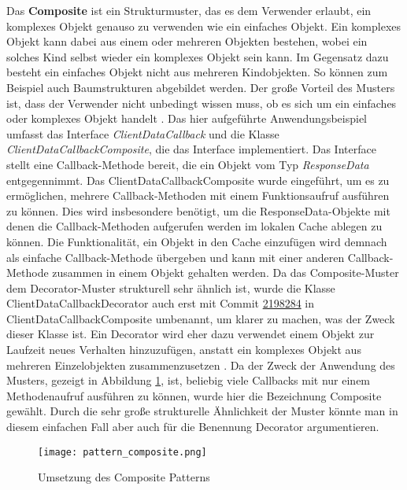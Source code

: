 Das \textbf{Composite} ist ein Strukturmuster, das es dem Verwender erlaubt, ein komplexes Objekt genauso zu verwenden wie ein einfaches Objekt.
Ein komplexes Objekt kann dabei aus einem oder mehreren Objekten bestehen, wobei ein solches Kind selbst wieder ein komplexes Objekt sein kann.
Im Gegensatz dazu besteht ein einfaches Objekt nicht aus mehreren Kindobjekten.
So können zum Beispiel auch Baumstrukturen abgebildet werden.
Der große Vorteil des Musters ist, dass der Verwender nicht unbedingt wissen muss, ob es sich um ein einfaches oder komplexes Objekt handelt
\cite[pp.~142--155]{geirhos2015entwurfsmuster}.
\newline
Das hier aufgeführte Anwendungsbeispiel umfasst das Interface \textit{ClientDataCallback} und die Klasse \textit{ClientDataCallbackComposite}, die das Interface implementiert.
Das Interface stellt eine Callback-Methode bereit, die ein Objekt vom Typ \textit{ResponseData} entgegennimmt.
Das ClientDataCallbackComposite wurde eingeführt, um es zu ermöglichen, mehrere Callback-Methoden mit einem Funktionsaufruf ausführen zu können.
Dies wird insbesondere benötigt, um die ResponseData-Objekte mit denen die Callback-Methoden aufgerufen werden im lokalen Cache ablegen zu können.
Die Funktionalität, ein Objekt in den Cache einzufügen wird demnach als einfache Callback-Methode übergeben und kann mit einer anderen Callback-Methode zusammen in einem Objekt gehalten werden.
\newline
Da das Composite-Muster dem Decorator-Muster strukturell sehr ähnlich ist, wurde die Klasse ClientDataCallbackDecorator auch erst mit Commit \href{https://github.com/lukaspanni/OpenSourceStats/commit/2198284a8f90a76a0e0a2e99f9be87855595458e}{2198284} in ClientDataCallbackComposite umbenannt, um klarer zu machen, was der Zweck dieser Klasse ist.
Ein Decorator wird eher dazu verwendet einem Objekt zur Laufzeit neues Verhalten hinzuzufügen, anstatt ein komplexes Objekt aus mehreren Einzelobjekten zusammenzusetzen \cite[pp.~155-169]{geirhos2015entwurfsmuster}.
Da der Zweck der Anwendung des Musters, gezeigt in Abbildung \ref{fig:pattern_composite}, ist, beliebig viele Callbacks mit nur einem Methodenaufruf ausführen zu können, wurde hier die Bezeichnung Composite gewählt.
Durch die sehr große strukturelle Ähnlichkeit der Muster könnte man in diesem einfachen Fall aber auch für die Benennung Decorator argumentieren.

\begin{figure}[h]
    \texttt{[image: pattern\_composite.png]}
    \centering
    \caption{Umsetzung des Composite Patterns}
    \label{fig:pattern_composite}
\end{figure}


